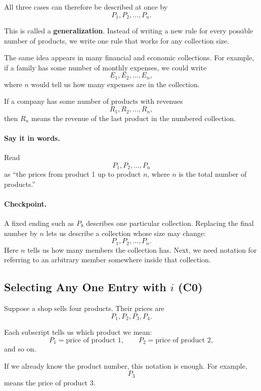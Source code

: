 	All three cases can therefore be described at once by
	\[
	P_1,P_2,\ldots,P_n.
	\]
	
	This is called a \textbf{generalization}. Instead of writing a new rule for every possible number of products, we write one rule that works for any collection size.
	
	The same idea appears in many financial and economic collections. For example, if a family has some number of monthly expenses, we could write
	\[
	E_1,E_2,\ldots,E_n,
	\]
	where $n$ would tell us how many expenses are in the collection.
	
	If a company has some number of products with revenues
	\[
	R_1,R_2,\ldots,R_n,
	\]
	then $R_n$ means the revenue of the last product in the numbered collection.
	
	\paragraph{Say it in words.}
	Read
	\[
	P_1,P_2,\ldots,P_n
	\]
	as ``the prices from product 1 up to product $n$, where $n$ is the total number of products.''
	
	\paragraph{Checkpoint.}
	A fixed ending such as $P_8$ describes one particular collection. Replacing the final number by $n$ lets us describe a collection whose size may change:
	\[
	P_1,P_2,\ldots,P_n.
	\]
	Here $n$ tells us how many members the collection has. Next, we need notation for referring to an arbitrary member somewhere inside that collection.
	
	
	\subsection{Selecting Any One Entry with $i$ (C0)}
	\label{sec:position-i-c0}
	
	Suppose a shop sells four products. Their prices are
	\[
	P_1,P_2,P_3,P_4.
	\]
	
	Each subscript tells us which product we mean:
	\[
	P_1=\text{price of product 1},\qquad
	P_2=\text{price of product 2},
	\]
	and so on.
	
	If we already know the product number, this notation is enough. For example,
	\[
	P_3
	\]
	means the price of product 3.
	
